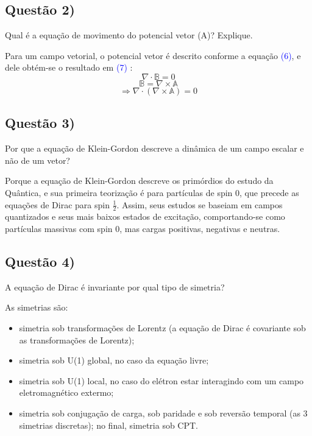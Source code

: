 \documentclass{article}
\begin{document}
     
     
     \vspace{2mm}
    

\vspace{5mm}
\begin{boxx}
\subsection*{Questão 2)}
Qual é a equação de movimento do potencial vetor (A)? Explique.
\end{boxx}
  Para um campo vetorial, o potencial vetor é descrito conforme a equação \textcolor{blue}{(6)}, e dele obtém-se o resultado em \textcolor{blue}{(7)} :
\begin{equation}
    \nabla\cdot\mathbb{B}=0 
\end{equation}
\begin{equation}
    \mathbb{B}=\nabla\times\mathbb{A}
\end{equation}
\begin{equation}
    \Rightarrow \nabla\cdot(\nabla\times\mathbb{A})=0
\end{equation}




\vspace{5mm}
\begin{boxx}
\subsection*{Questão 3)}
Por que a equação de Klein-Gordon descreve a dinâmica de um campo escalar e não de um vetor?
\end{boxx}
Porque a equação de Klein-Gordon descreve os primórdios do estudo da Quântica, e sua primeira teorização é para partículas de spin 0, que precede as equações de Dirac para spin $\frac{1}{2}$. Assim, seus estudos se baseiam em campos quantizados e seus mais baixos estados de excitação, comportando-se como partículas massivas com spin 0, mas cargas positivas, negativas e neutras. 

\subsection*{Questão 4)}
\begin{boxx}
A equação de Dirac é invariante por qual tipo de simetria?
\end{boxx}
 As simetrias são:
\begin{itemize}
    \item simetria sob transformações de Lorentz (a equação de Dirac
é covariante sob as transformações de Lorentz);

    \item simetria sob U(1) global, no caso da equação livre;

    \item simetria sob U(1) local, no caso do elétron estar interagindo com
um campo eletromagnético extermo;

    \item simetria sob conjugação de carga, sob paridade e sob reversão temporal
(as 3 simetrias discretas); no final, simetria sob CPT.
\end{itemize}
\end{document}
